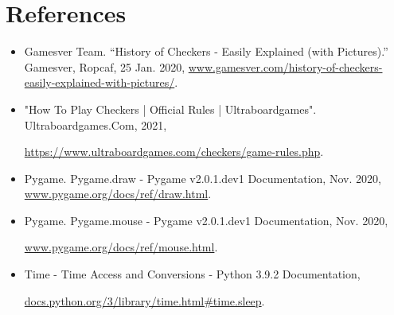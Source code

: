 \documentclass[fontsize=11pt]{article}
\begin{document}
\section*{References}

\begin{itemize}
    \item Gamesver Team. “History of Checkers - Easily Explained (with Pictures).” Gamesver, Ropcaf, 25 Jan. 2020,
    \url{www.gamesver.com/history-of-checkers-easily-explained-with-pictures/}. 
    
    \item "How To Play Checkers | Official Rules | Ultraboardgames". Ultraboardgames.Com, 2021,
    
    \url{https://www.ultraboardgames.com/checkers/game-rules.php}.
    
    \item Pygame. Pygame.draw - Pygame v2.0.1.dev1 Documentation, Nov. 2020, 
    \url{www.pygame.org/docs/ref/draw.html}. 

    \item Pygame. Pygame.mouse - Pygame v2.0.1.dev1 Documentation, Nov. 2020, 
    
    \url{www.pygame.org/docs/ref/mouse.html}.

    \item Time - Time Access and Conversions - Python 3.9.2 Documentation, 
    
    \url{docs.python.org/3/library/time.html#time.sleep}.

\end{itemize}
\end{document}
